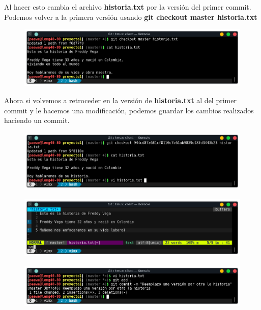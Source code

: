 \documentclass{article}
\begin{document}
Al hacer esto cambia el archivo \textbf{historia.txt} por la versión del primer
commit.\\

Podemos volver a la primera versión usando \textbf{git checkout master
historia.txt}

\begin{figure}[h!]
  \centering
  \includegraphics[scale=0.75]{./Pictures/124_checkout_master.png}
\end{figure}

Ahora si volvemos a retroceder en la versión de \textbf{historia.txt} al del
primer commit y le hacemos una modificación, podemos guardar los cambios
realizados haciendo un commit.

\newpage

\begin{figure}[h!]
  \centering
  \includegraphics[scale=0.75]{./Pictures/125_checkout_historia.png}
\end{figure}

\begin{figure}[h!]
  \centering
  \includegraphics[scale=0.75]{./Pictures/126_vim_historia.png}
\end{figure}

\begin{figure}[h!]
  \centering
  \includegraphics[scale=0.75]{./Pictures/127_git_commit.png}
\end{figure}
\end{document}
